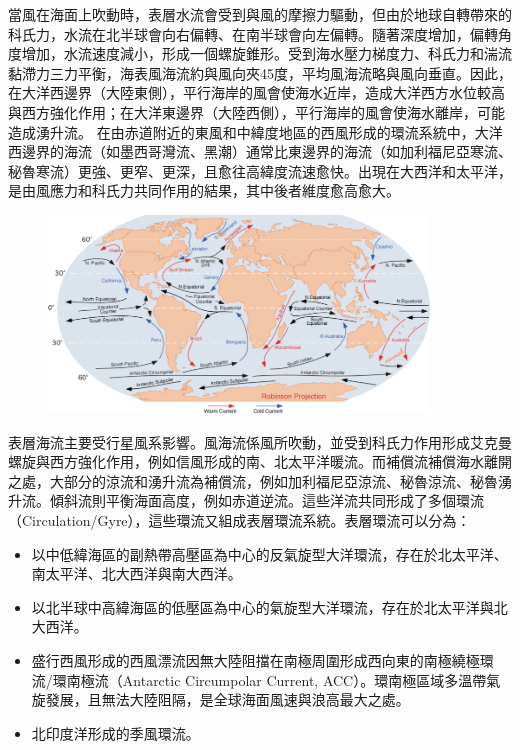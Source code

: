 \documentclass[a4paper,12pt]{report}
\begin{document}
當風在海面上吹動時，表層水流會受到與風的摩擦力驅動，但由於地球自轉帶來的科氏力，水流在北半球會向右偏轉、在南半球會向左偏轉。隨著深度增加，偏轉角度增加，水流速度減小，形成一個螺旋錐形。受到海水壓力梯度力、科氏力和湍流黏滯力三力平衡，海表風海流約與風向夾45度，平均風海流略與風向垂直。因此，在大洋西邊界（大陸東側），平行海岸的風會使海水近岸，造成大洋西方水位較高與西方強化作用；在大洋東邊界（大陸西側），平行海岸的風會使海水離岸，可能造成湧升流。
在由赤道附近的東風和中緯度地區的西風形成的環流系統中，大洋西邊界的海流（如墨西哥灣流、黑潮）通常比東邊界的海流（如加利福尼亞寒流、秘魯寒流）更強、更窄、更深，且愈往高緯度流速愈快。出現在大西洋和太平洋，是由風應力和科氏力共同作用的結果，其中後者維度愈高愈大。
\begin{figure}[H]
    \centering
    \includegraphics[width=0.9\textwidth]{表層洋流.png}
\end{figure}\FB
表層海流主要受行星風系影響。風海流係風所吹動，並受到科氏力作用形成艾克曼螺旋與西方強化作用，例如信風形成的南、北太平洋暖流。而補償流補償海水離開之處，大部分的涼流和湧升流為補償流，例如加利福尼亞涼流、秘魯涼流、秘魯湧升流。傾斜流則平衡海面高度，例如赤道逆流。這些洋流共同形成了多個環流（Circulation/Gyre），這些環流又組成表層環流系統。表層環流可以分為：
\begin{itemize}
\item 以中低緯海區的副熱帶高壓區為中心的反氣旋型大洋環流，存在於北太平洋、南太平洋、北大西洋與南大西洋。
\item 以北半球中高緯海區的低壓區為中心的氣旋型大洋環流，存在於北太平洋與北大西洋。
\item 盛行西風形成的西風漂流因無大陸阻擋在南極周圍形成西向東的南極繞極環流/環南極流（Antarctic Circumpolar Current, ACC）。環南極區域多溫帶氣旋發展，且無法大陸阻隔，是全球海面風速與浪高最大之處。
\item 北印度洋形成的季風環流。
\end{itemize}
\end{document}
